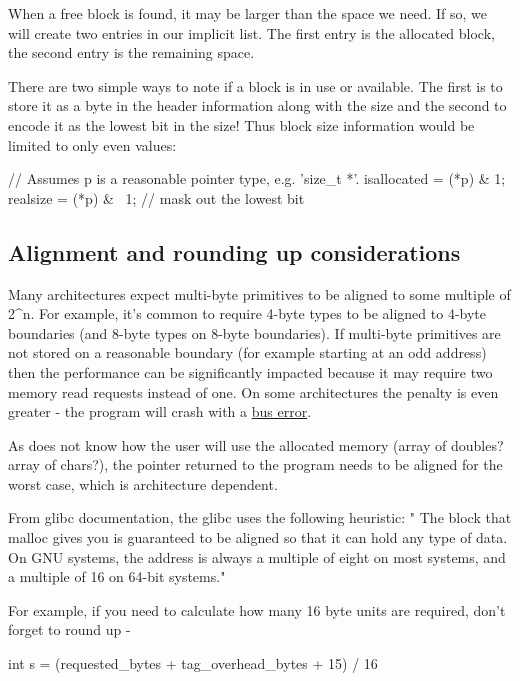 When a free block is found, it may be larger than the space we need. If so, we will create two entries in our implicit list. The first entry is the allocated block, the second entry is the remaining space.

There are two simple ways to note if a block is in use or available. The first is to store it as a byte in the header information along with the size and the second to encode it as the lowest bit in the size! Thus block size information would be limited to only even values:

\begin{code}[language=C]
// Assumes p is a reasonable pointer type, e.g. 'size_t *'.
isallocated = (*p) & 1;
realsize = (*p) & ~1;  // mask out the lowest bit
\end{code}

\subsection{Alignment and rounding up considerations}

Many architectures expect multi-byte primitives to be aligned to some multiple of 2\^{}n. For example, it's common to require 4-byte types to be aligned to 4-byte boundaries (and 8-byte types on 8-byte boundaries). If multi-byte primitives are not stored on a reasonable boundary (for example starting at an odd address) then the performance can be significantly impacted because it may require two memory read requests instead of one. On some architectures the penalty is even greater - the program will crash with a \href{http://en.wikipedia.org/wiki/Bus_error\#Unaligned_access}{bus error}.

As  does not know how the user will use the allocated memory (array of doubles? array of chars?), the pointer returned to the program needs to be aligned for the worst case, which is architecture dependent.

From glibc documentation, the glibc  uses the following heuristic: " The block that malloc gives you is guaranteed to be aligned so that it can hold any type of data. On GNU systems, the address is always a multiple of eight on most systems, and a multiple of 16 on 64-bit systems."

For example, if you need to calculate how many 16 byte units are required, don't forget to round up -

\begin{code}[language=C]
int s = (requested_bytes + tag_overhead_bytes + 15) / 16
\end{code}

